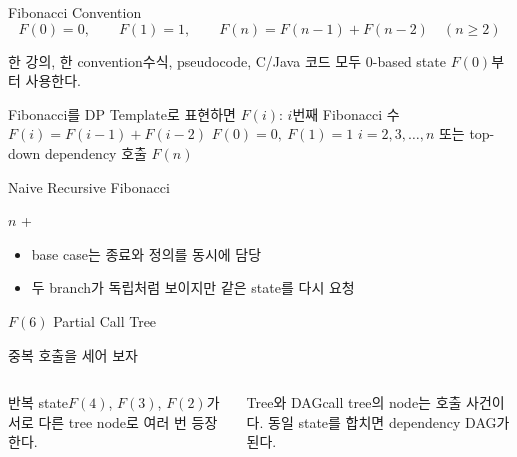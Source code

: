 \begin{frame}{Fibonacci Convention}
\[F(0)=0,\qquad F(1)=1,\qquad F(n)=F(n-1)+F(n-2)\quad(n\ge2)\]
\begin{block}{한 강의, 한 convention}수식, pseudocode, C/Java 코드 모두 0-based state $F(0)$부터 사용한다.\end{block}
\end{frame}
\begin{frame}{Fibonacci를 DP Template로 표현하면}
\small
\dpdesign
{$F(i)$: $i$번째 Fibonacci 수}
{$F(i)=F(i-1)+F(i-2)$}
{$F(0)=0,\ F(1)=1$}
{$i=2,3,\ldots,n$ 또는 top-down dependency 호출}
{$F(n)$}
\end{frame}
\begin{frame}{Naive Recursive Fibonacci}
\small\begin{algorithmic}[1]
\State\Return $n$\EndIf
\State\Return {}+
\EndProcedure
\end{algorithmic}
\begin{itemize}\item base case는 종료와 정의를 동시에 담당\item 두 branch가 독립처럼 보이지만 같은 state를 다시 요청\end{itemize}
\end{frame}
\begin{frame}{\texorpdfstring{$F(6)$}{F(6)} Partial Call Tree}
\centering{}
\end{frame}
\begin{frame}{중복 호출을 세어 보자}
\begin{columns}[T]
\begin{block}{반복 state}$F(4)$, $F(3)$, $F(2)$가 서로 다른 tree node로 여러 번 등장한다.\end{block}
\begin{block}{Tree와 DAG}call tree의 node는 호출 사건이다. 동일 state를 합치면 dependency DAG가 된다.\end{block}
\end{columns}
\end{frame}

